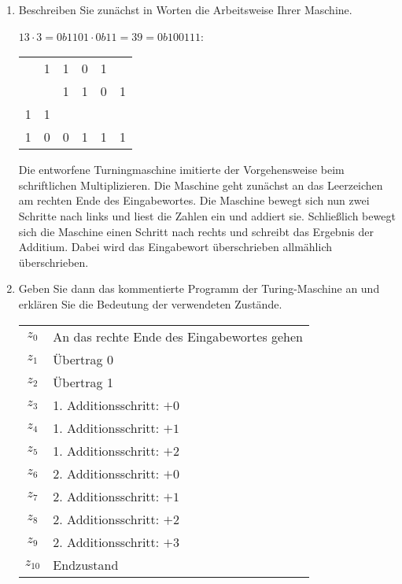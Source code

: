 \documentclass{bschlangaul-aufgabe}
\begin{document}
\begin{enumerate}


\item Beschreiben Sie zunächst in Worten die Arbeitsweise Ihrer
Maschine.

\begin{bAntwort}
$13 \cdot 3 = 0b1101 \cdot 0b11 = 39 = 0b100111$:

\begin{center}
\begin{tabular}{llllll}
  & 1 & 1 & 0 & 1 &   \\
  &   & 1 & 1 & 0 & 1 \\
{\tiny 1} & {\tiny 1} &   &   &   &   \\\hline
1 & 0 & 0 & 1 & 1 & 1
\end{tabular}
\end{center}

Die entworfene Turningmaschine imitierte der Vorgehensweise beim
schriftlichen Multiplizieren. Die Maschine geht zunächst an das
Leerzeichen am rechten Ende des Eingabewortes. Die Maschine bewegt sich
nun zwei Schritte nach links und liest die Zahlen ein und addiert sie.
Schließlich bewegt sich die Maschine einen Schritt nach rechts und
schreibt das Ergebnis der Additium. Dabei wird das Eingabewort
überschrieben allmählich überschrieben.
\end{bAntwort}


\item Geben Sie dann das kommentierte Programm der Turing-Maschine an
und erklären Sie die Bedeutung der verwendeten Zustände.

\begin{bAntwort}
\begin{tabularx}{\linewidth}{cX}
$z_0$ & An das rechte Ende des Eingabewortes gehen \\
$z_1$ & Übertrag 0\\
$z_2$ & Übertrag 1\\
$z_3$ & 1. Additionsschritt: $+0$ \\
$z_4$ & 1. Additionsschritt: $+1$ \\
$z_5$ & 1. Additionsschritt: $+2$ \\
$z_6$ & 2. Additionsschritt: $+0$ \\
$z_7$ & 2. Additionsschritt: $+1$ \\
$z_8$ & 2. Additionsschritt: $+2$ \\
$z_9$ & 2. Additionsschritt: $+3$ \\
$z_{10}$ & Endzustand \\
\end{tabularx}


\end{bAntwort}
\end{enumerate}
\end{document}
